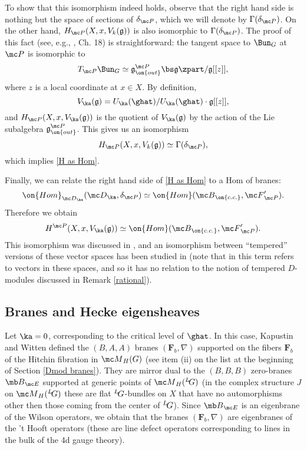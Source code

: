 \documentclass[11pt,reqno]{amsart}
\theoremstyle{plain}
\numberwithin{equation}{section}
\newcommand{\g}{\mathfrak{g}}
\def\neg{\negthinspace}
\def\LG{{}^L\neg G}
\theoremstyle{definition}
\begin{document}
To show that this isomorphism indeed holds, observe that the right
hand side is nothing but the space of sections of $\delta_{\mc P}$,
which we will denote by $\Gamma(\delta_{\mc P})$. On the other hand,
$H_{\mc P}(X,x,V_k(\g))$ is also isomorphic to $\Gamma(\delta_{\mc
  P})$. The proof of this fact (see, e.g., \cite{FB}, Ch. 18) is
straightforward: the tangent space to $\Bun_G$ at ${\mc P}$ is
isomorphic to
\begin{equation}    \label{tangent}
T_{\mc P} \Bun_G \simeq \g^{\mc P}_{\on{out}} \bs \g\zpart/\g[[z]],
\end{equation}
where $z$ is a local coordinate at $x \in X$. By definition,
$$
V_\ka(\g) = U_\ka(\ghat)/U_\ka(\ghat) \cdot \g[[z]],
$$
and $H_{\mc P}(X,x,V_\ka(\g))$ is the quotient of $V_\ka(\g)$ by the
action of the Lie subalgebra $\g^{\mc P}_{\on{out}}$. This gives us an
isomorphism
$$
H_{\mc P}(X,x,V_k(\g)) \simeq \Gamma(\delta_{\mc P}),
$$
which implies \eqref{H as Hom}.

Finally, we can relate the right hand side of \eqref{H as Hom} to a
Hom of branes:
\begin{equation}    \label{Hom1}
\on{Hom}_{{\mc D}_\ka}({\mc
  D}_\ka,\delta_{\mc P}) \simeq \on{Hom}({\mc B}_{\on{c.c.}},{\mc
  F}'_{\mc P}).
\end{equation}
Therefore we obtain
\begin{equation}    \label{Hom2}
H^{\mc P}(X,x,V_\ka(\g)) \simeq \on{Hom}({\mc B}_{\on{c.c.}},{\mc
  F}'_{\mc P}).
\end{equation}
This isomorphism was discussed in \cite{FW}, and an isomorphism
between ``tempered'' versions of these vector spaces has been studied
in \cite{BT} (note that in \cite{BT} this term refers to vectors in
these spaces, and so it has no relation to the notion of tempered
$D$-modules discussed in Remark \ref{rational}).

\subsection{Branes and Hecke eigensheaves}    \label{hecke}

Let $\ka=0$, corresponding to the critical level of $\ghat$. In this
case, Kapustin and Witten defined the $(B,A,A)$ branes $({\mathbf
  F}_b,\nabla)$ supported on the fibers ${\mathbf F}_b$ of the Hitchin
fibration in ${\mc M}_H(G)$ (see item (ii) on the list at the
beginning of Section \ref{Dmod branes}). They are mirror dual to the
$(B,B,B)$ zero-branes ${\mb B}_{\mc E}$ supported at generic points of
${\mc M}_H(\LG)$ (in the complex structure $J$ on ${\mc M}_H(\LG)$
these are flat $\LG$-bundles on $X$ that have no automorphisms other
then those coming from the center of $\LG$). Since ${\mb B}_{\mc E}$
is an eigenbrane of the Wilson operators, we obtain that the branes
$({\mathbf F}_b,\nabla)$ are eigenbranes of the 't Hooft operators
(these are line defect operators corresponding to lines in the bulk of
the 4d gauge theory).
\end{document}
